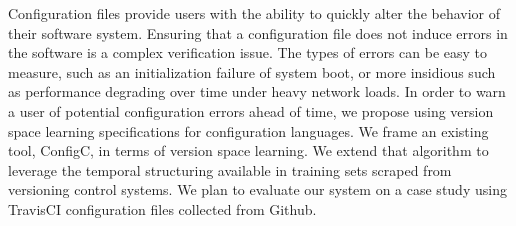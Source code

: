 Configuration files provide users with the ability to quickly alter the behavior of their software system.
Ensuring that a configuration file does not induce errors in the software is a complex verification issue.
The types of errors can be easy to measure, such as an initialization failure of system boot, 
   or more insidious such as performance degrading over time under heavy network loads.
In order to warn a user of potential configuration errors ahead of time, we propose using version space learning specifications for configuration languages.
We frame an existing tool, ConfigC, in terms of version space learning.
We extend that algorithm to leverage the temporal structuring available in training sets scraped from versioning control systems.
We plan to evaluate our system on a case study using TravisCI configuration files collected from Github.
 
